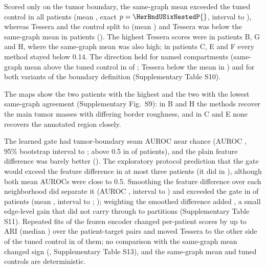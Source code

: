Scored only on the tumor boundary, the same-graph mean exceeded the tuned control in all \HerPatients{} patients (mean \HerBndUSixNestedMean{}, exact \(p=\HerBndUSixNestedP{}\), interval \HerBndUSixNestedLo{} to \HerBndUSixNestedHi{}), whereas Tessera and the control split \HerBndTessNestedPos{} to \HerBndTessNestedNeg{} (mean \HerBndTessNestedMean{}) and Tessera was below the same-graph mean in \HerBndTessUSixNeg{} patients (). The highest Tessera scores were in patients B, G and H, where the same-graph mean was also high; in patients C, E and F every method stayed below 0.14. The direction held for named compartments (same-graph mean above the tuned control in \HerCompUSixNestedPos{} of \HerPatients{}; Tessera below the mean in \HerCompTessUSixNeg{}) and for both variants of the boundary definition (Supplementary Table S10).

The maps show the two patients with the highest and the two with the lowest same-graph agreement (Supplementary Fig.~S9): in B and H the methods recover the main tumor masses with differing border roughness, and in C and E none recovers the annotated region closely.

The learned gate had tumor-boundary seam AUROC near chance (AUROC \HerBndSeamGate{}, 95\% bootstrap interval \HerBndSeamGateLo{} to \HerBndSeamGateHi{}; above 0.5 in \HerBndGateAboveChance{} of \HerPatients{} patients), and the plain feature difference was barely better (\HerBndSeamRaw{}). The exploratory protocol prediction that the gate would exceed the feature difference in at most three patients \HerHTwoVerdict{} (it did in \HerBndGateOverRaw{}), although both mean AUROCs were close to 0.5. Smoothing the feature difference over each neighborhood did separate it (AUROC \HerBndSeamSmooth{}, interval \HerBndSeamSmoothLo{} to \HerBndSeamSmoothHi{}) and exceeded the gate in \HerBndSeamSmoothGatePos{} of \HerPatients{} patients (mean \HerBndSeamSmoothGateMean{}, interval \HerBndSeamSmoothGateLo{} to \HerBndSeamSmoothGateHi{}; ); weighting the smoothed difference added \HerBndSeamSmoothPlainMean{}, a small edge-level gain that did not carry through to partitions (Supplementary Table S11). Repeated fits of the frozen encoder changed per-patient scores by up to \RepMaxRange{} ARI (median \RepMedianRange{}) over the \RepPairs{} patient-target pairs and moved Tessera to the other side of the tuned control in \RepSignChangesControl{} of them; no comparison with the same-graph mean changed sign (, Supplementary Table S13), and the same-graph mean and tuned controls are deterministic.

